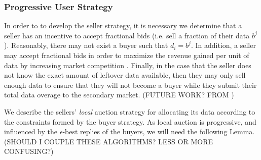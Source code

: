 \documentclass[12pt]{article}
\theoremstyle{definition}
\begin{document}
\begin{multicols}{2}
\subsubsection{Progressive User Strategy}
In order to to develop the seller strategy, it is necessary we determine 
that a seller has an incentive to
accept fractional bids (i.e. sell a fraction of their data $b^j$). Reasonably,
there may not exist a buyer such that $d_i = b^j$. In addition, a seller may accept
fractional bids in order to
maximize the revenue gained per unit of data by increasing market competition
\cite{???}.
Finally, in the case that the seller does not know the exact amount of
leftover data available, then they may only sell enough data to ensure that
they will not become a buyer while they submit their total data overage to the
secondary market. (FUTURE WORK? FROM \cite{zheng})

We describe the sellers' \emph{local} auction strategy for allocating its
data according to the constraints formed by the buyer strategy. As
local auction is progressive, and influenced by the $\epsilon$-best replies of
the buyers, we will need the following Lemma. (SHOULD I COUPLE THESE
ALGORITHMS? LESS OR MORE CONFUSING?)


\end{multicols}
\end{document}
